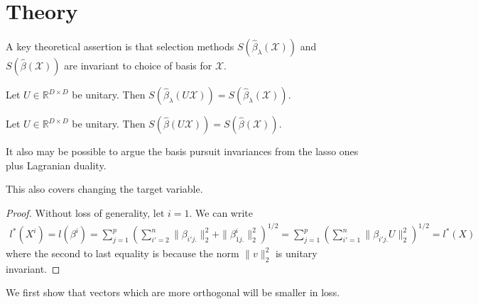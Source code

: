 \documentclass[a4paper,11pt]{article}
\begin{document}
\section{Theory}
\label{sec:theory}

A key theoretical assertion is that selection methods $S(\widehat {\beta}_{\lambda} (\mathcal X))$ and $S(\widehat {\beta} (\mathcal X))$ are invariant to choice of basis for $\mathcal X$.

\begin{proposition}
\label{prop:lasso_selection_equivalence}
Let $U \in \mathbb R^{D \times D}$ be unitary.
 Then $S(\widehat \beta_{\lambda}  (U \mathcal X)) = S(\widehat \beta_{\lambda} (\mathcal X))$.
\end{proposition}

\begin{proposition}
\label{prop:basis_pursuit_selection_equivalence}
Let $U \in \mathbb R^{D \times D}$ be unitary.
 Then $S(\widehat \beta  (U \mathcal X)) = S(\widehat \beta (\mathcal X))$.
\end{proposition}

It also may be possible to argue the basis pursuit invariances from the lasso ones plus Lagranian duality.

This also covers changing the target variable.

\begin{proof}
Without loss of generality, let $i = 1$.
We can write 
\begin{eqnarray}
l^*(X^i) = l(\beta^i) = \sum_{j = 1}^p (\sum_{i'=2}^n \| \beta_{i'j.} \|_2^2 +  \|  \beta_{1j.}^i \|_2^2 )^{1/2}=  \sum_{j = 1}^p (\sum_{i'=1}^n \| \beta_{i'j.} U \|_2^2)^{1/2} = l^*(X)
\end{eqnarray}
where the second to last equality is because the norm $\|v\|_2^2 $ is unitary invariant.
\end{proof}

We first show that vectors which are more orthogonal will be smaller in loss.
\end{document}
